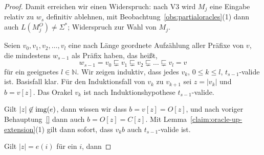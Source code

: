 \begin{proof}
    Damit erreichen wir einen Widerspruch: nach V3 wird $M_j$ eine Eingabe relativ zu $w_s$ definitiv ablehnen, mit Beobachtung~\ref{obs:partialoracles}(1) dann auch $L(M_j^O)\neq\Sigma^*$; Widerspruch zur Wahl von $M_j$.

    Seien $v_0, v_1, v_2, \dots, v_l$ eine nach Länge geordnete Aufzählung aller Präfixe von $v$, die mindestens $w_{s-1}$ als Präfix haben, das heißt, 
    \[ w_{s-1} = v_0 \sqsubsetneq v_1 \sqsubsetneq v_2 \sqsubsetneq \dots \sqsubsetneq v_l = v \]
    für ein geeignetes $l\in\mathbb N$.
    Wir zeigen induktiv, dass jedes $v_k$, $0\leq k\leq l$, $t_{s-1}$-valide ist.
    Basisfall klar.
    Für den Induktionsfall von $v_k$ zu $v_{k+1}$ sei $z=|v_k|$ und $b=v[z]$. 
    Das Orakel $v_k$ ist nach Induktionshypothese $t_{s-1}$-valide.

    Gilt $|z|\not\in\operatorname{img}(e)$, dann wissen wir dass $b = v[z] = O[z]$, und nach voriger Behauptung~\ref{} dann auch $b = O[z] = C[z]$.
    Mit Lemma~\ref{claim:oracle-up-extension}(1) gilt dann sofort, dass $v_kb$ auch $t_{s-1}$-valide ist.

    Gilt $|z|=e(i)$ für ein $i$, dann 
    
\end{proof}

